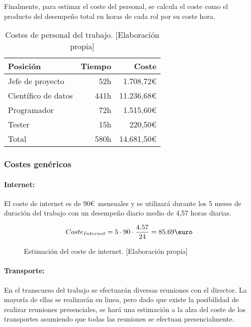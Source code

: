 Finalmente, para estimar el coste del personal, se calcula el coste como el producto del desempeño
total en horas de cada rol por su coste hora.

\begin{table}[ht]
    \begin{center}
        \begin{tabular}{ l r r }
         Posición & Tiempo & Coste \\
         \hline
         Jefe de proyecto & 52h & 1.708,72\euro \\
         Científico de datos & 441h & 11.236,68\euro \\
         Programador & 72h & 1.515,60\euro \\
         Tester & 15h & 220,50\euro \\
         \hline
         Total & 580h & 14.681,50\euro
        \end{tabular}
        \caption{Costes de personal del trabajo. [Elaboración propia]}\label{rolcosttable}
    \end{center}
\end{table}


\subsubsection{Costes genéricos}\label{costesgenericos}
\paragraph{Internet:} El coste de internet es de 90\euro\ mensuales y se utilizará durante los 5 meses de
duración del trabajo con un desempeño diario medio de 4,57 horas diarias.
\begin{figure}[ht]
    \begin{align*}
        Coste_{Internet} = 5 \cdot 90 \cdot \frac{4.57}{24} = 85.69\text{\euro}
    \end{align*}
    \caption{Estimación del coste de internet.  [Elaboración propia]}
\end{figure}

\paragraph{Transporte:} En el transcurso del trabajo se efectuarán diversas reuniones con el director. La mayoría de ellas
se realizarán en linea, pero dado que existe la posibilidad de realizar reuniones presenciales, se hará una estimación
a la alza del coste de los transportes asumiendo que todas las reuniones se efectuan presencialmente.

